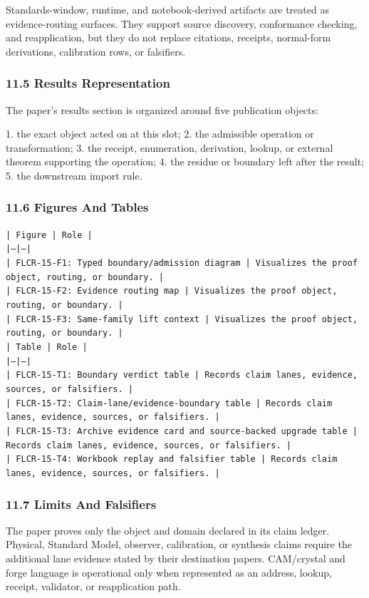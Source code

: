 \documentclass[11pt]{article}
\begin{document}
Standards-window, runtime, and notebook-derived artifacts are treated
as evidence-routing surfaces. They support source discovery, conformance
checking, and reapplication, but they do not replace citations, receipts,
normal-form derivations, calibration rows, or falsifiers.

\subsubsection*{11.5 Results Representation}

The paper's results section is organized around five publication objects:

1. the exact object acted on at this slot;
2. the admissible operation or transformation;
3. the receipt, enumeration, derivation, lookup, or external theorem supporting
   the operation;
4. the residue or boundary left after the result;
5. the downstream import rule.

\subsubsection*{11.6 Figures And Tables}

\noindent\texttt{| Figure | Role |}\\
\noindent\texttt{|---|---|}\\
\noindent\texttt{| FLCR-15-F1: Typed boundary/admission diagram | Visualizes the proof object, routing, or boundary. |}\\
\noindent\texttt{| FLCR-15-F2: Evidence routing map | Visualizes the proof object, routing, or boundary. |}\\
\noindent\texttt{| FLCR-15-F3: Same-family lift context | Visualizes the proof object, routing, or boundary. |}\\

\noindent\texttt{| Table | Role |}\\
\noindent\texttt{|---|---|}\\
\noindent\texttt{| FLCR-15-T1: Boundary verdict table | Records claim lanes, evidence, sources, or falsifiers. |}\\
\noindent\texttt{| FLCR-15-T2: Claim-lane/evidence-boundary table | Records claim lanes, evidence, sources, or falsifiers. |}\\
\noindent\texttt{| FLCR-15-T3: Archive evidence card and source-backed upgrade table | Records claim lanes, evidence, sources, or falsifiers. |}\\
\noindent\texttt{| FLCR-15-T4: Workbook replay and falsifier table | Records claim lanes, evidence, sources, or falsifiers. |}\\

\subsubsection*{11.7 Limits And Falsifiers}

The paper proves only the object and domain declared in its claim ledger.
Physical, Standard Model, observer, calibration, or synthesis claims require
the additional lane evidence stated by their destination papers. CAM/crystal
and forge language is operational only when represented as an address, lookup,
receipt, validator, or reapplication path.
\end{document}
